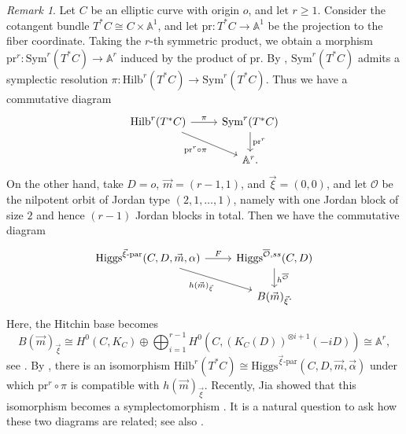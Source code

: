 \documentclass[11pt]{amsart}
\theoremstyle{plain}
\theoremstyle{definition}
\theoremstyle{remark}
\newtheorem{rem}[theorem]{Remark}
\newcommand{\ov}[1]{\overline{#1}}
\newcommand{\cO}{\mathcal O}
\newcommand{\Higgs}{\mathrm{Higgs}}
\def\a{\alpha}
\def\vxi{\vec{\xi}}
\def\vm{\vec{m}}
\def\va{\vec{\a}}
\newcommand{\pr}{\textrm{pr}}
\begin{document}
\begin{rem}
   Let $C$ be an elliptic curve with origin $o$, and let $r \geq 1$. Consider the cotangent bundle $T^*C \cong C \times \mathbb{A}^1$, and let $\pr:T^*C \to \mathbb{A}^1$ be the projection to the fiber coordinate. Taking the $r$-th symmetric product, we obtain a morphism $\pr^r:\mathrm{Sym}^r(T^*C)\to \mathbb{A}^r$ induced by the product of $\pr$. By \cite{Fogarty1968, Beauville2000}, $\mathrm{Sym}^r(T^*C)$ admits a symplectic resolution $\pi:\mathrm{Hilb}^r(T^*C)\to \mathrm{Sym}^r(T^*C)$. Thus we have a commutative diagram
\begin{equation*}\label{eq:diag Hilb}
    \begin{tikzcd}
\mathrm{Hilb}^r(T^*C) \arrow[r, "\pi"] \arrow[rd, "\pr^r\circ\pi"'] &
\mathrm{Sym}^r(T^*C) \arrow[d, "\pr^r"] \\
& \mathbb{A}^r.
\end{tikzcd}
\end{equation*}
On the other hand, take $D=o$, $\vec m=(r-1,1)$, and $\vec \xi=(0,0)$, and let $\cO$ be the nilpotent orbit of Jordan type $(2,1,\dots,1)$, namely with one Jordan block of size $2$ and hence $(r-1)$ Jordan blocks in total. Then we have the commutative diagram 
\[
\begin{tikzcd}
\Higgs^{\vec\xi\text{-par}}(C,D,\vec m,\alpha) \arrow[r, "F"] \arrow[rd, swap, "h(\vm)_{\vxi}"] &
\Higgs^{\overline{\cO},ss}(C,D) \arrow[d, "h^{\ov\cO}"] \\
& B(\vec m)_{\vec\xi}.
\end{tikzcd}
\]
Here, the Hitchin base becomes 
\[B(\vec m)_{\vec \xi}\cong H^0(C,K_C)\oplus \bigoplus_{i=1}^{r-1} H^0\left(C,\left(K_C\left(D\right)\right)^{\otimes i+1}(-iD)\right)\cong \mathbb{A}^r,\]
see \cite{Suwangwen2022}. By \cite[Theorem 5.1]{Groechenig2014HilbertHiggs}, there is an isomorphism $\mathrm{Hilb}^r(T^*C) \cong \Higgs^{\vxi\text{-par}}(C,D,\vm,\va)$ under which $\pr^r\circ \pi$ is compatible with $h(\vm)_{\vxi}$. Recently, Jia showed that this isomorphism becomes a symplectomorphism \cite[Theorem 3.5]{Jia2025Symplectic}. It is a natural question to ask how these two diagrams are related; see also  \cite[Theorem 3.6]{Jia2025Symplectic}.
\end{rem}
\end{document}
